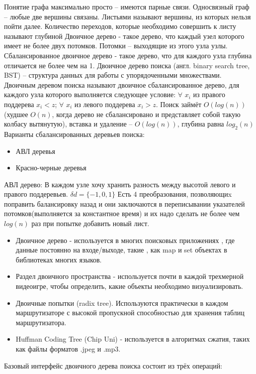 \documentclass[a4paper, 12pt]{article}
\begin{document}
	Понятие графа максимально просто -- имеются парные связи.  Односвязный граф -- любые две вершины связаны. Листьями называют вершины, из которых нельзя пойти далее. Количество переходов, которые необходимо совершить к листу называют глубиной
	Двоичное дерево - такое дерево, что каждый узел которого имеет не более двух потомков. Потомки -- выходящие из этого узла узлы. Сбалансированное двоичное дерево - такое дерево, что для каждого узла глубина отличается не более чем на 1. Двоичное дерево поиска (англ. binary search tree, BST) -- структура данных для работы с упорядоченными множествами.  Двоичным деревом поиска называют двоичное сбалансированное дерево, для каждого узла которого выполняется следующее условие:
	$\forall$ $x_{i}$ из правого поддерева $x_i<z$; $\forall$ $x_{i}$ из левого поддерева $x_i>z$.
	Поиск займёт $O(log(n))$ (худшее $O(n)$, когда дерево не сбалансировано и представляет собой такую колбасу вытянутую), вставка и удаление -- $O(log(n))$, глубина равна $log_{2}(n)$ 
	Варианты сбалансированных деревьев поиска:
	\begin{itemize}
		\item АВЛ деревья
		\item Красно-черные деревья
	\end{itemize}
	АВЛ дерево: В каждом узле хочу хранить разность между высотой левого и правого поддеревьев. $\delta d = \{  -1, 0, 1 \}$ Есть 4 преобразования, позволяющиx поправить балансировку назад и они заключаются в переписывании указателей потомков(выполняется за константное время) и их надо сделать не более чем $log(n)$ раз при попытке добавить новый лист.
	\begin{itemize}
		\item Двоичное дерево - используется в многих поисковых приложениях , где данные постоянно на входе/выходе, такие , как map и set объектах в библиотеках многих языков.
		\item Раздел двоичного пространства - используется почти в каждой трехмерной видеоигре, чтобы определить, какие объекты необходимо визуализировать.
		\item Двоичные попытки (radix tree). Используются практически в каждом маршрутизаторе с высокой пропускной способностью для хранения таблиц маршрутизатора.
		\item Huffman Coding Tree (Chip Uni) - используется в алгоритмах сжатия, таких как файлы форматов .jpeg и .mp3.
	\end{itemize}
	Базовый интерфейс двоичного дерева поиска состоит из трёх операций:
	
\end{document}
